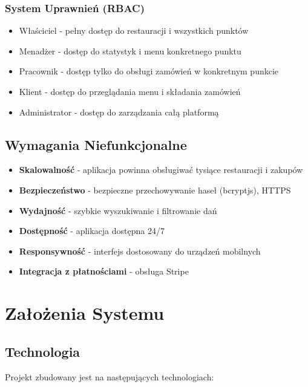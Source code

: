 \documentclass[12pt,a4paper,utf-8]{article}
\begin{document}
\subsubsection{System Uprawnień (RBAC)}

\begin{itemize}
    \item Właściciel - pełny dostęp do restauracji i wszystkich punktów
    \item Menadżer - dostęp do statystyk i menu konkretnego punktu
    \item Pracownik - dostęp tylko do obsługi zamówień w konkretnym punkcie
    \item Klient - dostęp do przeglądania menu i składania zamówień
    \item Administrator - dostęp do zarządzania całą platformą
\end{itemize}

\subsection{Wymagania Niefunkcjonalne}

\begin{itemize}
    \item \textbf{Skalowalność} - aplikacja powinna obsługiwać tysiące restauracji i zakupów
    \item \textbf{Bezpieczeństwo} - bezpieczne przechowywanie haseł (bcryptjs), HTTPS
    \item \textbf{Wydajność} - szybkie wyszukiwanie i filtrowanie dań
    \item \textbf{Dostępność} - aplikacja dostępna 24/7
    \item \textbf{Responsywność} - interfejs dostosowany do urządzeń mobilnych
    \item \textbf{Integracja z płatnościami}  -  obsługa Stripe
\end{itemize}

\newpage

\section{Założenia Systemu}

\subsection{Technologia}

Projekt zbudowany jest na następujących technologiach:
\end{document}
